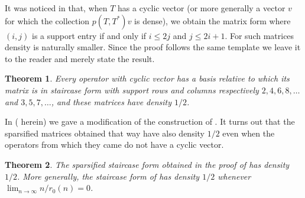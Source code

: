 \documentclass[10pt,reqno]{amsart}
\newtheorem{theorem}{Theorem}[section]
\theoremstyle{remark}
\numberwithin{equation}{section}
\begin{document}
It was noticed in \cite[Remark 20.3(i)]{PPW-2020-TmloVLOt} that, when $T$ has a cyclic vector (or more generally a vector $v$ for which the collection $p(T,T^*)v$ is dense), we obtain the matrix form where $(i,j)$ is a support entry if and only if $i \le 2j$ and $j \le 2i+1$.
For such matrices density is naturally smaller.
Since the proof follows the same template we leave it to the reader and merely state the result.

\begin{theorem}
  Every operator with cyclic vector has a basis relative to which its matrix is in staircase form with support rows and columns respectively $2,4,6,8,\dots$ and $3,5,7,\dots$, and these matrices have density $1/2$.
\end{theorem}

In \cite[Theorem 20.8]{PPW-2020-TmloVLOt} ( herein) we gave a modification of the construction of .
It turns out that the sparsified matrices obtained that way have also density $1/2$ even when the operators from which they came do not have a cyclic vector.

\begin{theorem}
  \label{thm:arbitrary-staircase-density}
  The sparsified staircase form obtained in the proof of  has density $1/2$.
  More generally, the staircase form of  has density $1/2$ whenever $\lim_{n \to \infty} n/r_0(n) = 0$.
\end{theorem}
\end{document}
